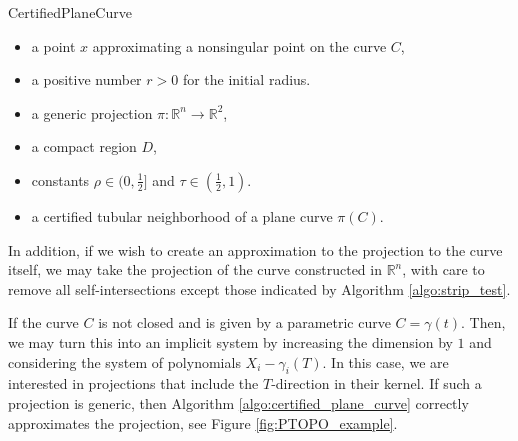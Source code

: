 \begin{algorithm}[ht]
	\caption{CertifiedPlaneCurve}
 \label{algo:certified_plane_curve}
\begin{algorithmic}[1]
\Require  
\begin{itemize}
    A regular curve $C=\{c_1,\dots,c_{n-1}\}\subset\mathbb{Q}[X_1,\dots,X_n]$,
    \item a point $x$ approximating a nonsingular point on the curve $C$,
    \item a positive number $r>0$ for the initial radius.
    \item a generic projection $\pi:\mathbb{R}^n\rightarrow \mathbb{R}^2$,
    \item a compact region $D$,
    \item constants $\rho\in(0,\frac{1}{2}]$ and $\tau\in(\frac{1}{2},1)$.
\end{itemize}
\Ensure 
\begin{itemize}
    \item a certified tubular neighborhood of a plane curve $\pi(C)$.
\end{itemize}

\Else{}
\EndIf
\EndWhile
{}
 \end{algorithmic}
 \end{algorithm}

 In addition, if we wish to create an approximation to the projection to the curve itself, we may take the projection of the curve constructed in $\mathbb{R}^n$, with care to remove all self-intersections except those indicated by Algorithm \ref{algo:strip_test}.

 \begin{remark}
If the curve $C$ is not closed and is given by a parametric curve $C=\gamma(t)$.  Then, we may turn this into an implicit system by increasing the dimension by $1$ and considering the system of polynomials $X_i-\gamma_i(T)$.  In this case, we are interested in projections that include the $T$-direction in their kernel.  If such a projection is generic, then Algorithm \ref{algo:certified_plane_curve} correctly approximates the projection, see Figure \ref{fig:PTOPO_example}.
 \end{remark}
